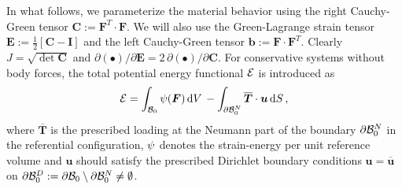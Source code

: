 \documentclass[times,doublespace]{nmeauth}
\def\gz  #1{           \mbox{$\boldsymbol{#1}$}}
\def\d {\mbox{d}}
\def\mcl  #1{               {\cal #1}}
\begin{document}
%
%
In what follows, we parameterize the material behavior using the right Cauchy-Green tensor $\gz C := \gz F^T \cdot \gz F$.
We will also use the Green-Lagrange strain tensor $\gz E:=\frac{1}{2}\left[\gz C - \gz I\right]$ and the left Cauchy-Green tensor $\gz b := \gz F \cdot \gz F^T$.
Clearly $J = \sqrt{\det \gz C}$ and $\partial (\bullet)/\partial \gz E = 2\, \partial (\bullet)/\partial \gz C$.
%
For conservative systems without body forces, the total potential energy functional $\mcl E$ is introduced as
\begin{align}
\mcl E =
\int_{\mcl B_0} \mcl \psi(\gz F) \, \d V \,
- \int_{\partial \mcl B_0^N} \overline{\gz T} \cdot \gz u \, \d S \, ,
\end{align}
where $\overline{\gz T}$ is the prescribed loading at the Neumann part of the boundary $\partial \mcl B_0^N$ in the {\color{red}referential} configuration, $\mcl \psi$ denotes the strain-energy per unit reference volume and $\gz u$ should satisfy the prescribed Dirichlet boundary conditions $\gz u = \overline{\gz u}$ on $\partial \mcl B_0^D := \partial \mcl B_0 \setminus \partial \mcl B_0^N \neq \emptyset $.
\end{document}
